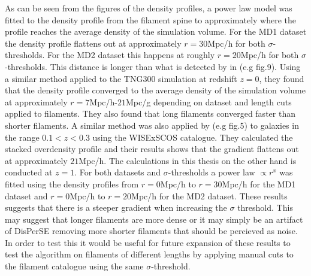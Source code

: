 As can be seen from the figures of the density profiles, a power law model was fitted to the density profile from the filament spine to approximately where the profile reaches the average density of the simulation volume. For the MD1 dataset the density profile flattens out at approximately $r=30$Mpc/h for both $\sigma$-thresholds. For the MD2 dataset this happens at roughly $r=20$Mpc/h for both $\sigma$-thresholds. This distance is longer than what is detected by in \cite{Gal_rraga_Espinosa_2020} (e.g fig.9). Using a similar method applied to the TNG300 simulation \cite{nelson2021illustristng} at redshift $z=0$, they found that the density profile converged to the average density of the simulation volume at approximately $r=7$Mpc/h-$21$Mpc/g depending on dataset and length cuts applied to filaments. They also found that long filaments converged faster than shorter filaments. A similar method was also applied by \cite{bonjean} (e.g fig.5) to galaxies in the range $0.1<z<0.3$ using the WISExSCOS catalogue\cite{Bilicki_2016}. They calculated the stacked overdensity profile and their results shows that the gradient flattens out at approximately $21$Mpc/h. The calculations in this thesis on the other hand is conducted at $z=1$. For both datasets and $\sigma$-thresholds a power law $\propto r^x$ was fitted using the density profiles from $r=0$Mpc/h to $r=30$Mpc/h for the MD1 dataset and $r=0$Mpc/h to $r=20$Mpc/h for the MD2 dataset. These results suggests that there is a steeper gradient when increasing the $\sigma$ threshold. This may suggest that longer filaments are more dense or it may simply be an artifact of DisPerSE removing more shorter filaments that should be percieved as noise. In order to test this it would be useful for future expansion of these results to test the algorithm on filaments of different lengths by applying manual cuts to the filament catalogue using the same $\sigma$-threshold.\\\indent
